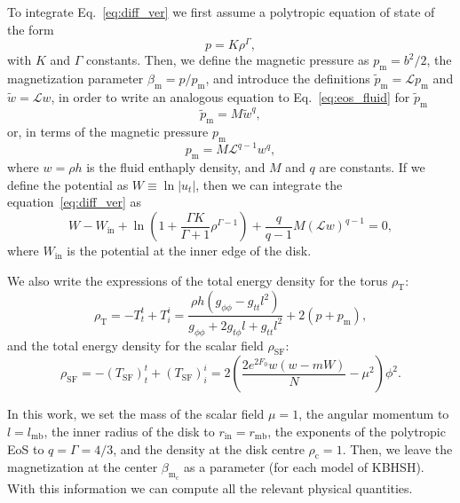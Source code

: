 \documentclass[twocolumn,aps,showpacs,showkeys,prd,superscriptaddress,byrevtex, amsmath]{revtex4-1}
\begin{document}
To integrate Eq.~\eqref{eq:diff_ver} we first assume a polytropic equation of state of the form
\begin{equation}\label{eq:eos_fluid}
p = K \rho^{\Gamma},
\end{equation}
with $K$ and $\Gamma$ constants.
Then, we define the magnetic pressure as $p_{\mathrm{m}} = b^2/2$, the magnetization parameter $\beta_{\mathrm{m}} = p/p_{\mathrm{m}}$, and introduce the definitions $\tilde{p}_{\mathrm{m}} = \mathcal{L} p_{\mathrm{m}}$ and $\tilde{w} = \mathcal{L} w$, in order to write an analogous equation to Eq.~\eqref{eq:eos_fluid} for $\tilde{p}_{\mathrm{m}}$
\begin{equation}\label{eq:eos_mag_tilde}
\tilde{p}_{\mathrm{m}} = M \tilde{w}^q,
\end{equation}
or, in terms of the magnetic pressure $p_{\mathrm{m}}$
\begin{equation}\label{eq:eos_mag}
p_{\mathrm{m}} = M \mathcal{L}^{q-1} w^q,
\end{equation}
where $w = \rho h$ is the fluid enthaply density, and $M$ and $q$ are constants.
If we define the potential as $W \equiv \ln |u_t|$, then we can integrate the equation~\eqref{eq:diff_ver} as
\begin{equation}\label{eq:final}
W - W_{\mathrm{in}} + \ln \left(1 + \frac{\Gamma K}{\Gamma +1}\rho^{\Gamma -1}\right) + \frac{q}{q-1}M(\mathcal{L}w)^{q-1}=0,
\end{equation}
where $W_{\mathrm{in}}$ is the potential at the inner edge of the disk.

We also write the expressions of the total energy density for the torus $\rho_{\mathrm{T}}$:
\begin{equation}\label{eq:torus_energy_density}
\rho_{\mathrm{T}} = -T^t_t + T^i_i = \frac{\rho h (g_{\phi\phi} - g_{tt} l^2)}{g_{\phi\phi} + 2 g_{t\phi} l + g_{tt} l^2} + 2 (p + p_{\mathrm{m}}),
\end{equation}
and the total energy density for the scalar field $\rho_{\mathrm{SF}}$:
\begin{equation}\label{eq:SF_energy_density}
\rho_{\mathrm{SF}} = -(T_{\mathrm{SF}})^t_t + (T_{\mathrm{SF}})^i_i = 2 \left(\frac{2 e^{2 F_0} w (w-m W)}{N} - \mu^2\right) \phi^2.
\end{equation}

In this work, we set the mass of the scalar field $\mu = 1$, the angular momentum to $l = l_{\mathrm{mb}}$, the inner radius of the disk to $r_{\mathrm{in}} = r_{\mathrm{mb}}$, the exponents of the polytropic EoS to $q = \Gamma = 4/3$, and the density at the disk centre $\rho_{\mathrm{c}} = 1$. Then, we leave the magnetization at the center $\beta_{\mathrm{m_c}}$ as a parameter (for each model of KBHSH). With this information we can compute all the relevant physical quantities.
\end{document}
